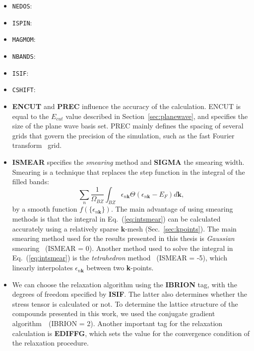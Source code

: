 \begin{refsection}
\begin{itemize}
 \label{appendix:sec-NEDOS} 
\item \texttt{NEDOS}:  
 
 \label{appendix:sec-ISPIN} 
\item \texttt{ISPIN}:  
 
 \label{appendix:sec-MAGMOM} 
\item \texttt{MAGMOM}:  
 
 \label{appendix:sec-NBANDS} 
\item \texttt{NBANDS}:  
 
 \label{appendix:sec-ISIF} 
\item \texttt{ISIF}:  
 
 \label{appendix:sec-CSHIFT} 
\item \texttt{CSHIFT}:  
 
\item \textbf{ENCUT} and \textbf{PREC} influence the accuracy of the 
calculation. ENCUT is equal to the $E_{cut}$ value described in 
Section~\ref{sec:planewave}, and specifies the size of the plane wave basis 
set.  PREC mainly defines the spacing of several grids that govern the 
precision of the simulation, such as the fast Fourier transform~\cite{numrec} 
grid. 
 
\item \textbf{ISMEAR} specifies the \textit{smearing} method and 
\textbf{SIGMA} the smearing width. Smearing is a technique that replaces the 
step function in the integral of the filled bands: 
\begin{equation}\label{eq:intsmear} 
\sum_n \frac{1}{\Omega_{BZ}}\int_{BZ} \epsilon_{n\mathbf{k}} 
\Theta(\epsilon_{n\mathbf{k}} - E_F) d\mathbf{k}, 
\end{equation} 
by a smooth function $f(\{\epsilon_{n\mathbf{k}}\})$. The main advantage of 
using smearing methods is that the integral in Eq.~(\ref{eq:intsmear}) can be 
calculated accurately using a relatively sparse $\mathbf{k}$-mesh 
(Sec.~\ref{sec:kpoints}). The main smearing method used for the results 
presented in this thesis is \textit{Gaussian} smearing~\cite{gaussian} (ISMEAR 
= 0). Another method used to solve the integral in Eq.~(\ref{eq:intsmear}) is 
the \textit{tetrahedron} method~\cite{tetrahedron} (ISMEAR = -5), which 
linearly interpolates $\epsilon_{n\mathbf{k}}$ between two \textbf{k}-points. 
 
 
\item We can choose the relaxation algorithm using the \textbf{IBRION} tag, 
with the degrees of freedom specified by \textbf{ISIF}. The latter also 
determines whether the stress tensor is calculated or not. To determine the 
lattice structure of the compounds presented in this work, we used the 
conjugate gradient algorithm~\cite{conjgrad}~\cite{iteratieve}(IBRION = 2). 
Another important tag for the relaxation calculation is \textbf{EDIFFG}, which 
sets the value for the convergence condition of the relaxation procedure. 
 

\end{itemize}
\end{refsection}
